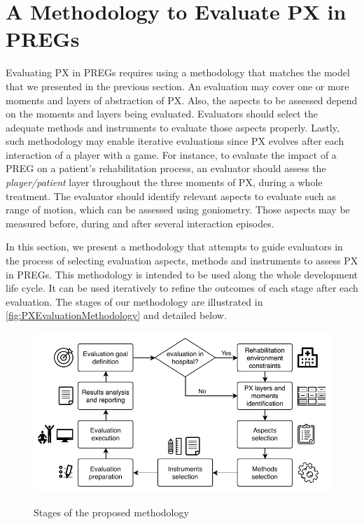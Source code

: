\section{A Methodology to Evaluate PX in PREGs}
\label{sec:methodology}
Evaluating \ac{PX} in \acp{PREG} requires using a methodology that matches the model that we presented in the previous section. An evaluation may cover one or more moments and layers of abstraction of \ac{PX}. Also, the aspects to be assessed depend on the moments and layers being evaluated. Evaluators should select the adequate methods and instruments to evaluate those aspects properly. Lastly, such methodology may enable iterative evaluations since \ac{PX} evolves after each interaction of a player with a game. For instance, to evaluate the impact of a \ac{PREG} on a patient's rehabilitation process, an evaluator should assess the \textit{player/patient} layer throughout the three moments of \ac{PX}, during a whole treatment. The evaluator should identify relevant aspects to evaluate such as range of motion, which can be assessed using goniometry. Those aspects may be measured before, during and after several interaction episodes.

In this section, we present a methodology that attempts to guide evaluators in the process of selecting evaluation aspects, methods and instruments to assess \ac{PX} in \acp{PREG}. This methodology is intended to be used along the whole development life cycle. It can be used iteratively to refine the outcomes of each stage after each evaluation. The stages of our methodology are illustrated in \autoref{fig:PXEvaluationMethodology} and detailed below.

\begin{figure}[bth]
\myfloatalign
{\includegraphics[width=\linewidth]{gfx/model/PXEvaluationMethodology}} \quad
\caption{Stages of the proposed methodology}\label{fig:PXEvaluationMethodology}
\end{figure}

